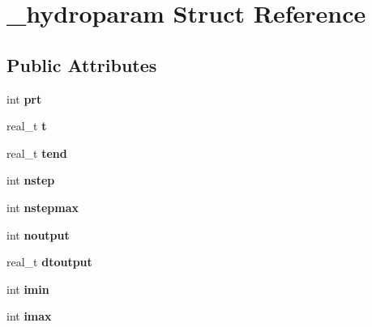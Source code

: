 \hypertarget{struct__hydroparam}{}\section{\+\_\+hydroparam Struct Reference}
\label{struct__hydroparam}
\subsection*{Public Attributes}
\begin{DoxyCompactItemize}
\item 
\hypertarget{struct__hydroparam_acaf9faa2254f629ddebea8d995923876}{}int {\bfseries prt}\label{struct__hydroparam_acaf9faa2254f629ddebea8d995923876}

\item 
\hypertarget{struct__hydroparam_afd974c30aa2fab832304d50117d9ba42}{}real\+\_\+t {\bfseries t}\label{struct__hydroparam_afd974c30aa2fab832304d50117d9ba42}

\item 
\hypertarget{struct__hydroparam_a047cbe44b381a8ba2d6d4eb8f04ae1dd}{}real\+\_\+t {\bfseries tend}\label{struct__hydroparam_a047cbe44b381a8ba2d6d4eb8f04ae1dd}

\item 
\hypertarget{struct__hydroparam_a27f2cfd6f78251533600b8618639b644}{}int {\bfseries nstep}\label{struct__hydroparam_a27f2cfd6f78251533600b8618639b644}

\item 
\hypertarget{struct__hydroparam_a812675efec0dab115672440224ee564f}{}int {\bfseries nstepmax}\label{struct__hydroparam_a812675efec0dab115672440224ee564f}

\item 
\hypertarget{struct__hydroparam_a5be8d2a2d5d4de5d43ba327d2cfd166d}{}int {\bfseries noutput}\label{struct__hydroparam_a5be8d2a2d5d4de5d43ba327d2cfd166d}

\item 
\hypertarget{struct__hydroparam_a6457ecd15acce66f2ea2ff9b73b84c27}{}real\+\_\+t {\bfseries dtoutput}\label{struct__hydroparam_a6457ecd15acce66f2ea2ff9b73b84c27}

\item 
\hypertarget{struct__hydroparam_a41bcd16faa59f7799e0d7a48294b9eb3}{}int {\bfseries imin}\label{struct__hydroparam_a41bcd16faa59f7799e0d7a48294b9eb3}

\item 
\hypertarget{struct__hydroparam_af6e44259da4cd2c53a7ecb85b766e1fc}{}int {\bfseries imax}\label{struct__hydroparam_af6e44259da4cd2c53a7ecb85b766e1fc}


\end{DoxyCompactItemize}
